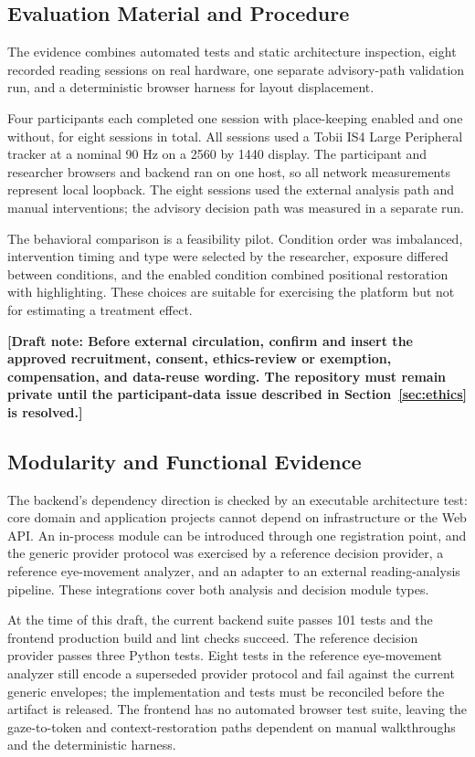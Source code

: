 \documentclass[sigconf,review,anonymous]{acmart}
\newcommand{\draftnote}[1]{\textcolor{draftred}{\textbf{[Draft note: #1]}}}
\begin{document}
\subsection{Evaluation Material and Procedure}

The evidence combines automated tests and static architecture inspection, eight recorded reading sessions on real hardware, one separate advisory-path validation run, and a deterministic browser harness for layout displacement.

Four participants each completed one session with place-keeping enabled and one without, for eight sessions in total.
All sessions used a Tobii IS4 Large Peripheral tracker at a nominal 90 Hz on a 2560 by 1440 display.
The participant and researcher browsers and backend ran on one host, so all network measurements represent local loopback.
The eight sessions used the external analysis path and manual interventions; the advisory decision path was measured in a separate run.

The behavioral comparison is a feasibility pilot.
Condition order was imbalanced, intervention timing and type were selected by the researcher, exposure differed between conditions, and the enabled condition combined positional restoration with highlighting.
These choices are suitable for exercising the platform but not for estimating a treatment effect.

\draftnote{Before external circulation, confirm and insert the approved recruitment, consent, ethics-review or exemption, compensation, and data-reuse wording. The repository must remain private until the participant-data issue described in Section~\ref{sec:ethics} is resolved.}

\subsection{Modularity and Functional Evidence}

The backend's dependency direction is checked by an executable architecture test: core domain and application projects cannot depend on infrastructure or the Web API.
An in-process module can be introduced through one registration point, and the generic provider protocol was exercised by a reference decision provider, a reference eye-movement analyzer, and an adapter to an external reading-analysis pipeline.
These integrations cover both analysis and decision module types.

At the time of this draft, the current backend suite passes 101 tests and the frontend production build and lint checks succeed.
The reference decision provider passes three Python tests.
Eight tests in the reference eye-movement analyzer still encode a superseded provider protocol and fail against the current generic envelopes; the implementation and tests must be reconciled before the artifact is released.
The frontend has no automated browser test suite, leaving the gaze-to-token and context-restoration paths dependent on manual walkthroughs and the deterministic harness.
\end{document}
